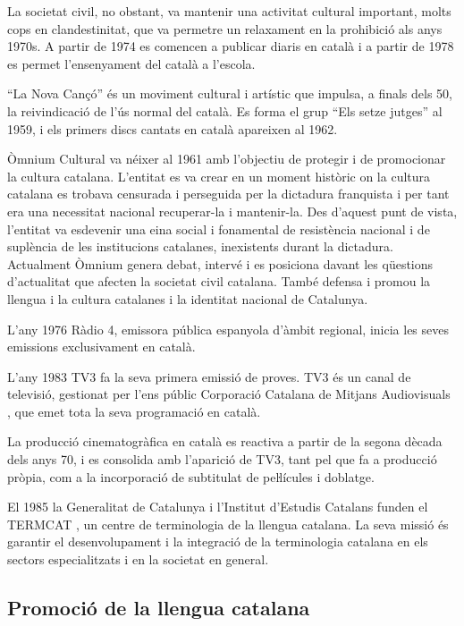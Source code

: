 \begin{multicols}{2}
La societat civil, no obstant, va mantenir una activitat cultural important, molts cops en clandestinitat, que va permetre un relaxament en la prohibició als anys 1970s. A partir de 1974 es comencen a publicar diaris en català i a partir de 1978 es permet l’ensenyament del català a l’escola.

 “La Nova Cançó” és un moviment cultural i artístic que impulsa, a finals dels 50, la reivindicació de l’ús normal del català. Es forma el grup “Els setze jutges” al 1959, i els primers discs cantats en català apareixen al 1962.

Òmnium Cultural \cite{CAT-omniumcultural} va néixer al 1961 amb l’objectiu de protegir i de promocionar la cultura catalana. L’entitat es va crear en un moment històric on la cultura catalana es trobava censurada i perseguida per la dictadura franquista i per tant era una necessitat nacional recuperar-la i mantenir-la. Des d’aquest punt de vista, l’entitat va esdevenir una eina social i fonamental de resistència nacional i de suplència de les institucions catalanes, inexistents durant la dictadura. Actualment Òmnium genera debat, intervé i es posiciona davant les qüestions d’actualitat que afecten la societat civil catalana. També defensa i promou la llengua i la cultura catalanes i la identitat nacional de Catalunya.

L’any 1976 Ràdio 4, emissora pública espanyola d’àmbit regional, inicia les seves emissions exclusivament en català.

L’any 1983 TV3 fa la seva primera emissió de proves. TV3 és un canal de televisió, gestionat per l’ens públic Corporació Catalana de Mitjans Audiovisuals \cite{CAT-CCMA}, que emet tota la seva programació en català.

La producció cinematogràfica en català es reactiva a partir de la segona dècada dels anys 70, i es consolida amb l’aparició de TV3, tant pel que fa a producció pròpia, com a la incorporació de subtitulat de peŀlícules i doblatge.

El 1985 la Generalitat de Catalunya i l’Institut d’Estudis Catalans funden el TERMCAT \cite{CAT-TERMCAT}, un centre de terminologia de la llengua catalana. La seva missió és garantir el desenvolupament i la integració de la terminologia catalana en els sectors especialitzats i en la societat en general.

\subsection{Promoció de la llengua catalana}


\end{multicols}
